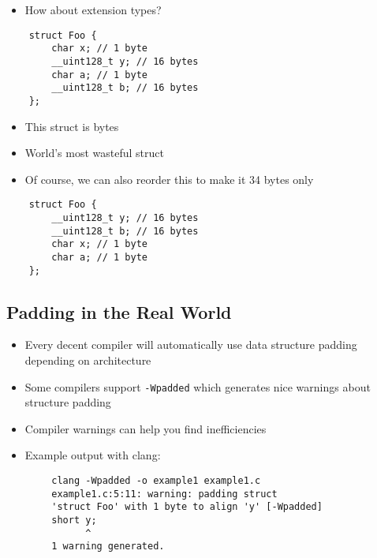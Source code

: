 \documentclass{beamer}
\begin{document}
\begin{frame}[fragile]{\insertsection}{\insertsubsection}
    \begin{itemize}
        \item How about extension types?
    \end{itemize}
    \begin{verbatim}
    struct Foo {
        char x; // 1 byte
        __uint128_t y; // 16 bytes
        char a; // 1 byte
        __uint128_t b; // 16 bytes
    };
    \end{verbatim}
    \begin{itemize}
        \item This struct is  bytes
        \item World's most wasteful struct
    \end{itemize}
\end{frame}

\begin{frame}[fragile]{\insertsection}{\insertsubsection}
    \begin{itemize}
        \item Of course, we can also reorder this to make it 34 bytes only
    \end{itemize}
    \begin{verbatim}
    struct Foo {
        __uint128_t y; // 16 bytes
        __uint128_t b; // 16 bytes
        char x; // 1 byte
        char a; // 1 byte
    };
    \end{verbatim}
\end{frame}

\subsection{Padding in the Real World}
\begin{frame}[fragile]{\insertsection}{\insertsubsection}
    \begin{itemize}
        \item Every decent compiler will automatically use data structure padding depending
            on architecture\pause
        \item Some compilers support \verb|-Wpadded| which generates nice warnings about structure
            padding\pause
        \item Compiler warnings can help you find inefficiencies
        \item Example output with clang:
    \end{itemize}
    \begin{verbatim}
        clang -Wpadded -o example1 example1.c
        example1.c:5:11: warning: padding struct 
        'struct Foo' with 1 byte to align 'y' [-Wpadded]
        short y;
              ^
        1 warning generated.
    \end{verbatim}
\end{frame}
\end{document}
